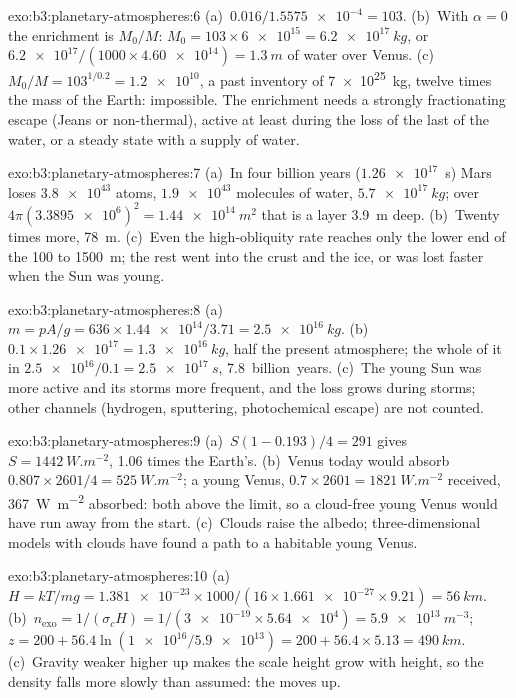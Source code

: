 \begin{solution}{exo:b3:planetary-atmospheres:6}
(a)~$0.016/\num{1.5575e-4} = 103$. (b)~With $\alpha = 0$ the enrichment is
$M_0/M$: $M_0 = 103\times\num{6e15} = \qty{6.2e17}{kg}$, or
$\num{6.2e17}/(1000\times\num{4.60e14}) = \qty{1.3}{m}$ of water over
Venus. (c)~$M_0/M = 103^{1/0.2} = \num{1.2e10}$, a past inventory of
\qty{7e25}{kg}, twelve times the mass of the Earth: impossible. The
enrichment needs a strongly fractionating escape (Jeans or non-thermal),
active at least during the loss of the last of the water, or a steady
state with a supply of water.
\end{solution}

\begin{solution}{exo:b3:planetary-atmospheres:7}
(a)~In four billion years ($\num{1.26e17}$~s) Mars loses
$\num{3.8e43}$ atoms, $\num{1.9e43}$ molecules of water, $\qty{5.7e17}{kg}$;
over $4\pi(\num{3.3895e6})^2 = \qty{1.44e14}{m^2}$ that is a layer
\qty{3.9}{m} deep. (b)~Twenty times more, \qty{78}{m}. (c)~Even the
high-obliquity rate reaches only the lower end of the 100 to
\qty{1500}{m}; the rest went into the crust and the ice, or was lost
faster when the Sun was young.
\end{solution}

\begin{solution}{exo:b3:planetary-atmospheres:8}
(a)~$m = pA/g = 636\times\num{1.44e14}/3.71 = \qty{2.5e16}{kg}$.
(b)~$0.1\times\num{1.26e17} = \qty{1.3e16}{kg}$, half the present
atmosphere; the whole of it in $\num{2.5e16}/0.1 = \qty{2.5e17}{s}$,
\num{7.8}~billion~years. (c)~The young Sun was more active and its
storms more frequent, and the loss grows during storms; other channels
(hydrogen, sputtering, photochemical escape) are not counted.
\end{solution}

\begin{solution}{exo:b3:planetary-atmospheres:9}
(a)~$S(1 - 0.193)/4 = 291$ gives $S = \qty{1442}{W.m^{-2}}$, 1.06 times
the Earth's. (b)~Venus today would absorb $0.807\times2601/4 =
\qty{525}{W.m^{-2}}$; a young Venus, $0.7\times2601 = \qty{1821}{W.m^{-2}}$
received, \qty{367}{W.m^{-2}} absorbed: both above the limit, so a
cloud-free young Venus would have run away from the start. (c)~Clouds
raise the albedo; three-dimensional models with clouds have found a path
to a habitable young Venus.
\end{solution}

\begin{solution}{exo:b3:planetary-atmospheres:10}
(a)~$H = kT/mg = \num{1.381e-23}\times1000/(16\times\num{1.661e-27}\times9.21)
= \qty{56}{km}$. (b)~$n_\mathrm{exo} = 1/(\sigma_c H) = 1/(\num{3e-19}\times
\num{5.64e4}) = \qty{5.9e13}{m^{-3}}$; $z = 200 + 56.4\ln(\num{1e16}/
\num{5.9e13}) = 200 + 56.4\times5.13 = \qty{490}{km}$. (c)~Gravity weaker
higher up makes the scale height grow with height, so the density falls
more slowly than assumed: the  moves up.
\end{solution}

